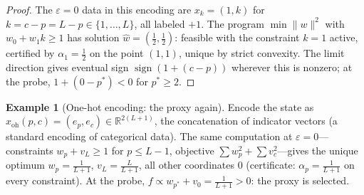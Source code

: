 \documentclass[11pt]{amsart}
\theoremstyle{plain}
\theoremstyle{definition}
\newtheorem{example}[theorem]{Example}
\begin{document}
\begin{proof}
The $\varepsilon=0$ data in this encoding are $x_k=(1,k)$ for $k=c-p=L-p\in\{1,\dots,L\}$, all labeled $+1$. The program $\min\|w\|^2$ with $w_0+w_1k\ge1$ has solution $\hat w=(\tfrac12,\tfrac12)$: feasible with the constraint $k=1$ active, certified by $\alpha_1=\tfrac12$ on the point $(1,1)$, unique by strict convexity. The limit direction gives eventual sign $\operatorname{sign}(1+(c-p))$ wherever this is nonzero; at the probe, $1+(0-p^{*})<0$ for $p^{*}\ge2$.
\end{proof}

\begin{example}[One-hot encoding: the proxy again]\label{ex:onehot}
Encode the state as $x_{\mathrm{oh}}(p,c)=(e_p,e_c)\in\mathbb R^{2(L+1)}$, the concatenation of indicator vectors (a standard encoding of categorical data). The same computation at $\varepsilon=0$---constraints $w_p+v_L\ge1$ for $p\le L-1$, objective $\sum w_p^2+\sum v_c^2$---gives the unique optimum $w_p=\frac1{L+1}$, $v_L=\frac{L}{L+1}$, all other coordinates $0$ (certificate: $\alpha_p=\frac1{L+1}$ on every constraint). At the probe, $f\propto w_{p^{*}}+v_0=\frac{1}{L+1}>0$: the proxy is selected.
\end{example}
\end{document}
